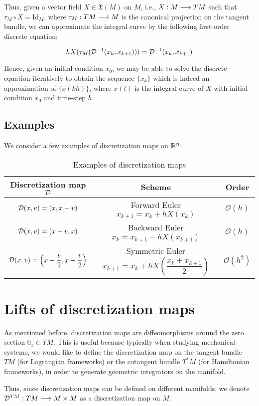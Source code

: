 Thus, given a vector field $X \in \mathfrak{X}(M)$ on $M$, i.e., $X: M \lra TM$ such that $\tau_M \circ X = \text{Id}_M$, where $\tau_M: TM \lra M$ is the canonical projection on the tangent bundle, we can approximate the integral curve by the following first-order discrete equation:

\[
  h X(\tau_M(\D^{-1}(x_k, x_{k+1}))) = \D^{-1}(x_k, x_{k+1})
\]

Hence, given an initial condition $x_0$, we may be able to solve the discrete equation iteratively to obtain the sequence $\{x_k\}$ which is indeed an approximation of $\{x(kh)\}$, where $x(t)$ is the integral curve of $X$ with initial condition $x_0$ and time-step $h$.

\subsection{Examples}
We consider a few examples of discretization maps on $\R[n]$:

\begin{table}[h]
\centering
\begin{tabular}{|c|c|c|}
\hline
 Discretization map $\D$ & Scheme & Order \\
\hline
 $\D(x,v) = (x, x + v)$ & Forward Euler $x_{k+1} = x_k + hX(x_k)$ & $\mathcal{O}(h)$ \\
 $\D(x,v) = (x - v, x)$ & Backward Euler $x_k = x_{k+1} - hX(x_{k+1})$ & $\mathcal{O}(h)$\\
 $\D(x, v) = \left(x - \dfrac{v}{2}, x + \dfrac{v}{2} \right)$ & Symmetric Euler $x_{k+1} = x_k + hX\left( \dfrac{x_k + x_{k+1}}{2}\right)$ & $\mathcal{O}(h^2)$\\
\hline
\end{tabular}
\caption{Examples of discretization maps}
\end{table}


\section{Lifts of discretization maps}

As mentioned before, discretization maps are diffeomorphisms around the zero section $0_x \in TM$. 
This is useful because typically when studying mechanical systems, we would like to define the discretization map on the tangent bundle $TM$ (for Lagrangian frameworks) or the cotangent bundle $T^*M$ (for Hamiltonian frameworks), in order to generate geometric integrators on the manifold.

Thus, since discretization maps can be defined on different manifolds, we denote $\D^{TM} : TM \lra M \times M$ as a discretization map on $M$.

